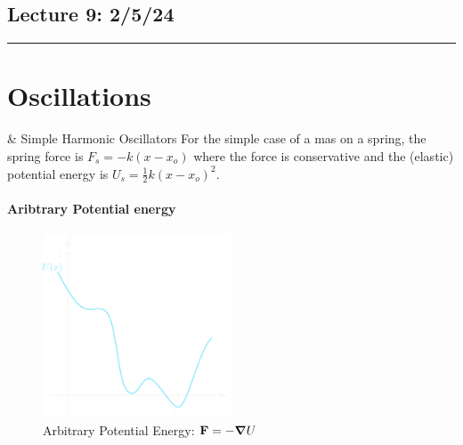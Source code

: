 \documentclass[../main.tex]{subfiles}
\begin{document}
\subsection*{Lecture 9: \hfill  2/5/24}
\hrule \vspace{10px}
\section{Oscillations}

\& Simple Harmonic Oscillators For the simple case of a mas on a spring, the spring force is
$F_{s} = -k(x - x_o)$
where the force is conservative and the (elastic) potential energy is
$U_s = \frac{1}{2} k (x - x_o)^2$.

\paragraph*{Aribtrary Potential energy} 
\begin{figure}[ht]
    \centering
    \includegraphics[width=0.5\textwidth]{5_1.png}
    \caption{Arbitrary Potential Energy: $\vb{F} = - \grad U$}
    \label{fig:fig1}
\end{figure}
\end{document}
